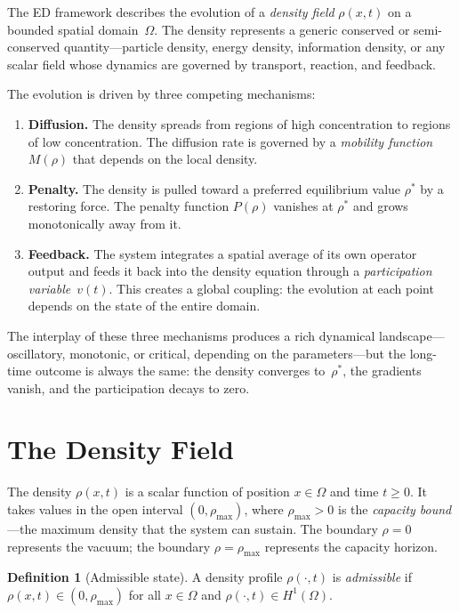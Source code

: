 \documentclass[11pt,twoside,openright]{book}
\theoremstyle{definition}
\newtheorem{definition}{Definition}[chapter]
\theoremstyle{plain}
\theoremstyle{definition}
\theoremstyle{remark}
\newcommand{\rhomax}{\rho_{\max}}
\newcommand{\rhostar}{\rho^{*}}
\begin{document}
The ED framework describes the evolution of a \emph{density field} \(\rho(x,t)\) on a bounded spatial domain~\(\Omega\). The density represents a generic conserved or semi-conserved quantity---particle density, energy density, information density, or any scalar field whose dynamics are governed by transport, reaction, and feedback.

The evolution is driven by three competing mechanisms:

\begin{enumerate}
\item \textbf{Diffusion.} The density spreads from regions of high concentration to regions of low concentration. The diffusion rate is governed by a \emph{mobility function} \(M(\rho)\) that depends on the local density.
\item \textbf{Penalty.} The density is pulled toward a preferred equilibrium value \(\rhostar\) by a restoring force. The penalty function \(P(\rho)\) vanishes at \(\rhostar\) and grows monotonically away from it.
\item \textbf{Feedback.} The system integrates a spatial average of its own operator output and feeds it back into the density equation through a \emph{participation variable}~\(v(t)\). This creates a global coupling: the evolution at each point depends on the state of the entire domain.
\end{enumerate}

The interplay of these three mechanisms produces a rich dynamical landscape---oscillatory, monotonic, or critical, depending on the parameters---but the long-time outcome is always the same: the density converges to~\(\rhostar\), the gradients vanish, and the participation decays to zero.

\section{The Density Field}\label{sec:density-field}

The density \(\rho(x,t)\) is a scalar function of position \(x \in \Omega\) and time \(t \geq 0\). It takes values in the open interval \((0, \rhomax)\), where \(\rhomax > 0\) is the \emph{capacity bound}---the maximum density that the system can sustain. The boundary \(\rho = 0\) represents the vacuum; the boundary \(\rho = \rhomax\) represents the capacity horizon.

\begin{definition}[Admissible state]\label{def:admissible}
A density profile \(\rho(\cdot, t)\) is \emph{admissible} if \(\rho(x,t) \in (0, \rhomax)\) for all \(x \in \Omega\) and \(\rho(\cdot, t) \in H^1(\Omega)\).
\end{definition}
\end{document}
